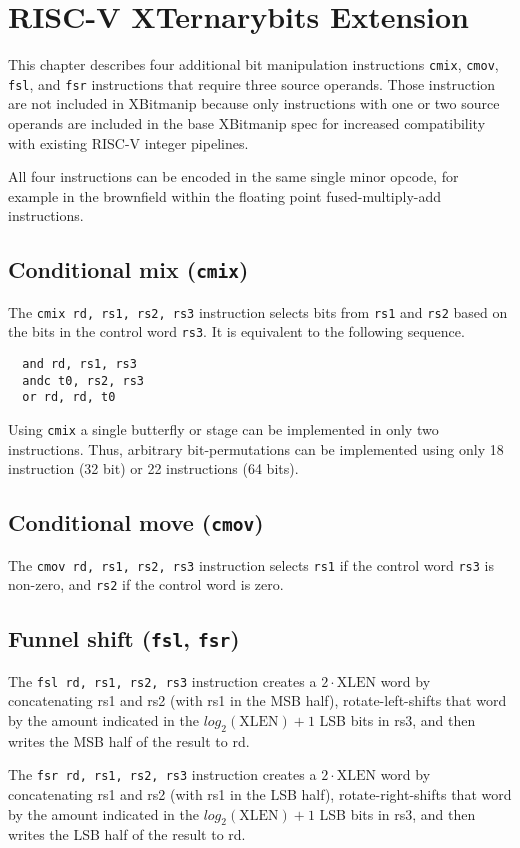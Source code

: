 \chapter{RISC-V XTernarybits Extension}
\label{tbits}

This chapter describes four additional bit manipulation instructions {\tt cmix}, {\tt cmov},
{\tt fsl}, and {\tt fsr} instructions that require three source operands. Those instruction
are not included in XBitmanip because only instructions with one or two source operands are
included in the base XBitmanip spec for increased compatibility with existing RISC-V integer
pipelines.

All four instructions can be encoded in the same single minor opcode, for example in the
brownfield within the floating point fused-multiply-add instructions.

\section{Conditional mix ({\tt cmix})}

The {\tt cmix rd, rs1, rs2, rs3} instruction selects bits from {\tt rs1} and {\tt rs2} based
on the bits in the control word {\tt rs3}. It is equivalent to the following sequence.

\begin{verbatim}
  and rd, rs1, rs3
  andc t0, rs2, rs3
  or rd, rd, t0
\end{verbatim}

Using {\tt cmix} a single butterfly or stage can be implemented in only two
instructions. Thus, arbitrary bit-permutations can be implemented using only
18 instruction (32 bit) or 22 instructions (64 bits).

\section{Conditional move ({\tt cmov})}

The {\tt cmov rd, rs1, rs2, rs3} instruction selects {\tt rs1} if the control
word {\tt rs3} is non-zero, and {\tt rs2} if the control word is zero.

\section{Funnel shift ({\tt fsl}, {\tt fsr})}

The {\tt fsl rd, rs1, rs2, rs3} instruction creates a $2\cdot\textrm{XLEN}$ word
by concatenating rs1 and rs2 (with rs1 in the MSB half), rotate-left-shifts that
word by the amount indicated in the $log_2(\textrm{XLEN})+1$ LSB bits in rs3, and
then writes the MSB half of the result to rd.

The {\tt fsr rd, rs1, rs2, rs3} instruction creates a $2\cdot\textrm{XLEN}$ word
by concatenating rs1 and rs2 (with rs1 in the LSB half), rotate-right-shifts that
word by the amount indicated in the $log_2(\textrm{XLEN})+1$ LSB bits in rs3, and
then writes the LSB half of the result to rd.

